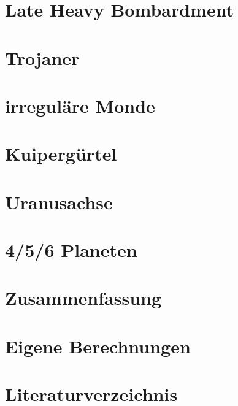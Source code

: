 \documentclass[10pt,a4paper,twoside]{article}
\begin{document}


\section{Late Heavy Bombardment}\label{LHB}

\section{Trojaner}\label{Trojaner}

\section{irreguläre Monde}\label{Monde}

\section{Kuipergürtel}\label{Kuiper}

\section{Uranusachse}\label{Uranusachse}

\section{4/5/6 Planeten}\label{mehrPlaneten}

\section{Zusammenfassung}

\newpage
\renewcommand{\thesection}{\Alph{section}}
\setcounter{section}{0} 
\section{Eigene Berechnungen}
\section{Literaturverzeichnis}

{}

\end{document}
